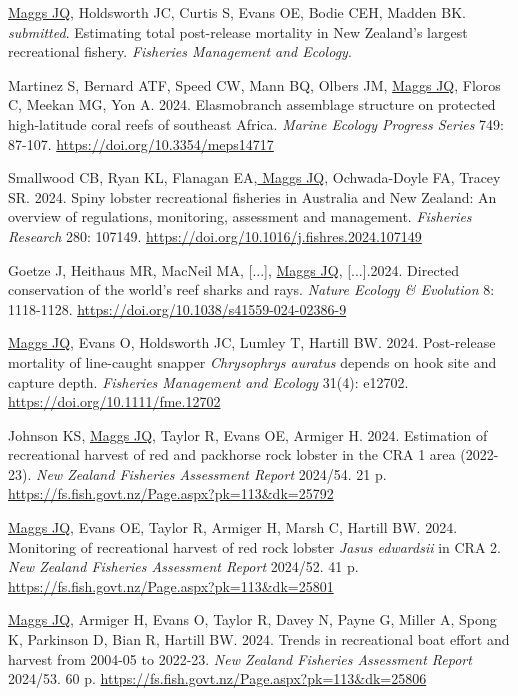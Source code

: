 \documentclass[10pt,a4paper]{article}
\begin{document}
\begin{hangparas}{1.5em}{1}

\underline{Maggs JQ}, Holdsworth JC, Curtis S, Evans OE, Bodie CEH, Madden BK. \textit{submitted}. Estimating total post-release mortality in New Zealand’s largest recreational fishery. \textit{Fisheries Management and Ecology}.

Martinez S, Bernard ATF, Speed CW, Mann BQ, Olbers JM, \underline{ Maggs JQ}, Floros C, Meekan MG, Yon A. 2024. Elasmobranch assemblage structure on protected high-latitude coral reefs of southeast Africa. \textit{Marine Ecology Progress Series} 749: 87-107. \url{https://doi.org/10.3354/meps14717}

Smallwood CB, Ryan KL, Flanagan EA,\underline{ Maggs JQ}, Ochwada-Doyle FA, Tracey SR. 2024. Spiny lobster recreational fisheries in Australia and New Zealand: An overview of regulations, monitoring, assessment and management. \textit{Fisheries Research} 280: 107149. \url{https://doi.org/10.1016/j.fishres.2024.107149}

Goetze J, Heithaus MR, MacNeil MA, [...], \underline{Maggs JQ}, [...].2024. Directed conservation of the world’s reef sharks and rays. \textit{Nature Ecology \& Evolution} 8: 1118-1128. \url{https://doi.org/10.1038/s41559-024-02386-9}

\underline{Maggs JQ},  Evans O, Holdsworth JC, Lumley T, Hartill BW. 2024. Post-release mortality of line-caught snapper \textit{Chrysophrys auratus} depends on hook site and capture depth. \textit{Fisheries Management and Ecology} 31(4): e12702. \url{https://doi.org/10.1111/fme.12702}

Johnson KS, \underline{Maggs JQ}, Taylor R, Evans OE, Armiger H. 2024. Estimation of recreational harvest of red and packhorse rock lobster in the CRA 1 area (2022-23). \textit{New Zealand Fisheries Assessment Report} 2024/54. 21 p. \url{https://fs.fish.govt.nz/Page.aspx?pk=113&dk=25792}

\underline{Maggs JQ}, Evans OE, Taylor R, Armiger H, Marsh C, Hartill BW. 2024. Monitoring of recreational harvest of red rock lobster \textit{Jasus edwardsii} in CRA 2. \textit{New Zealand Fisheries Assessment Report}  2024/52. 41 p. \url{https://fs.fish.govt.nz/Page.aspx?pk=113&dk=25801}

\underline{Maggs JQ}, Armiger H, Evans O, Taylor R, Davey N, Payne G, Miller A, Spong K, Parkinson D, Bian R, Hartill BW. 2024. Trends in recreational boat effort and harvest from 2004-05 to 2022-23. \textit{New Zealand Fisheries Assessment Report} 2024/53. 60 p. \url{https://fs.fish.govt.nz/Page.aspx?pk=113&dk=25806}


\end{hangparas}
\end{document}
